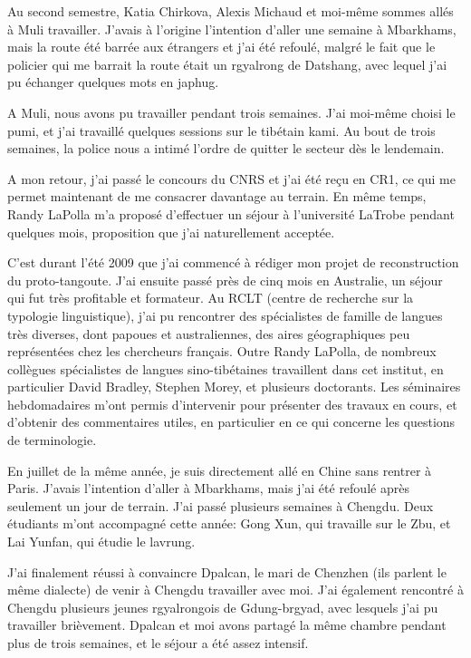 \documentclass[oldfontcommands,oneside,a4paper,11pt]{memoir}
\begin{document}
Au second semestre, Katia Chirkova, Alexis Michaud et moi-même sommes allés à Muli travailler. J'avais à l'origine l'intention d'aller une semaine à Mbarkhams, mais la route été barrée aux étrangers et j'ai été refoulé, malgré le fait que le policier qui me barrait la route était un rgyalrong de Datshang, avec lequel j'ai pu échanger quelques mots en japhug.

A Muli, nous avons pu travailler pendant trois semaines. J'ai moi-même choisi le pumi, et j'ai travaillé quelques sessions sur le tibétain kami. Au bout de trois semaines, la police nous a intimé l'ordre de quitter le secteur dès le lendemain.  

A mon retour, j'ai passé le concours du CNRS et j'ai été reçu en CR1, ce qui me permet maintenant de me consacrer davantage au terrain. En même temps, Randy LaPolla m'a proposé d'effectuer un séjour à l'université LaTrobe pendant quelques mois, proposition que j'ai naturellement acceptée.

C'est durant l'été 2009 que j'ai commencé à rédiger mon projet de reconstruction du proto-tangoute. J'ai ensuite passé près de cinq mois en Australie, un séjour qui fut très profitable et formateur. Au RCLT (centre de recherche sur la typologie linguistique), j'ai pu rencontrer des spécialistes de famille de langues très diverses, dont papoues et australiennes, des aires géographiques peu représentées chez les chercheurs français. Outre Randy LaPolla, de nombreux collègues spécialistes de langues sino-tibétaines travaillent dans cet institut, en particulier David Bradley, Stephen Morey, et plusieurs doctorants. Les séminaires hebdomadaires m'ont permis d'intervenir pour présenter des travaux en cours, et d'obtenir des commentaires utiles, en particulier en ce qui concerne les questions de terminologie.

En juillet de la même année, je suis directement allé en Chine sans rentrer à Paris. J'avais l'intention d'aller à Mbarkhams, mais   j'ai été refoulé après seulement un jour de terrain. J'ai passé plusieurs semaines  à Chengdu. Deux étudiants m'ont accompagné cette année: Gong Xun, qui travaille sur le Zbu, et Lai Yunfan, qui étudie le lavrung.

J'ai finalement réussi à convaincre Dpalcan, le mari de Chenzhen (ils parlent le même dialecte) de venir à Chengdu travailler avec moi. J'ai également rencontré à Chengdu plusieurs jeunes rgyalrongois de Gdung-brgyad, avec lesquels j'ai pu travailler brièvement. Dpalcan et moi avons partagé la même chambre pendant plus de trois semaines, et le séjour a été assez intensif.  
\end{document}
